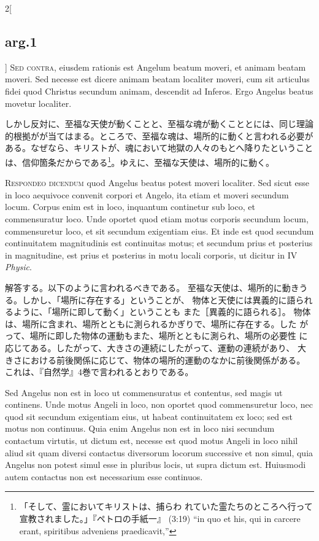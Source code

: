 \documentclass[paper=a4paper,fontsize=10pt,jafontsize=9pt,titlepage]{jlreq}
\begin{document}
\begin{paracol}{2}[\subsection{arg.1}]
{\scshape Sed contra}, eiusdem rationis est Angelum
beatum moveri, et animam beatam moveri. Sed necesse est dicere animam
beatam localiter moveri, cum sit articulus fidei quod Christus secundum
animam, descendit ad Inferos. Ergo Angelus beatus movetur localiter.

\switchcolumn

しかし反対に、至福な天使が動くことと、至福な魂が動くこととには、同じ理論
 的根拠がが当てはまる。ところで、至福な魂は、場所的に動くと言われる必要が
 ある。なぜなら、キリストが、魂において地獄の人々のもとへ降りたということ
 は、信仰箇条だからである\footnote{「そして、霊においてキリストは、捕らわ
 れていた霊たちのところへ行って宣教されました。」『ペトロの手紙一』
 (3:19) ``in quo et his, qui in carcere erant, spiritibus adveniens
 praedicavit,'' }。ゆえに、至福な天使は、場所的に動く。


{\scshape Respondeo dicendum} quod Angelus beatus potest
moveri localiter. Sed sicut esse in loco aequivoce convenit corpori et
Angelo, ita etiam et moveri secundum locum. Corpus enim est in loco,
inquantum continetur sub loco, et commensuratur loco. Unde oportet quod
etiam motus corporis secundum locum, commensuretur loco, et sit secundum
exigentiam eius. Et inde est quod secundum continuitatem magnitudinis
est continuitas motus; et secundum prius et posterius in magnitudine,
est prius et posterius in motu locali corporis, ut dicitur in IV
{\itshape Physic}.

\switchcolumn

解答する。以下のように言われるべきである。
至福な天使は、場所的に動きうる。しかし、「場所に存在する」ということが、
 物体と天使には異義的に語られるように、「場所に即して動く」ということも
 また［異義的に語られる］。
物体は、場所に含まれ、場所とともに測られるかぎりで、場所に存在する。した
 がって、場所に即した物体の運動もまた、場所とともに測られ、場所の必要性
 に応じてある。したがって、大きさの連続にしたがって、運動の連続があり、
 大きさにおける前後関係に応じて、物体の場所的運動のなかに前後関係がある。
 これは、『自然学』4巻で言われるとおりである。

\switchcolumn*

Sed Angelus non est in loco ut commensuratus et contentus, sed
magis ut continens. Unde motus Angeli in loco, non oportet quod
commensuretur loco, nec quod sit secundum exigentiam eius, ut habeat
continuitatem ex loco; sed est motus non continuus. Quia enim Angelus
non est in loco nisi secundum contactum virtutis, ut dictum est, necesse
est quod motus Angeli in loco nihil aliud sit quam diversi contactus
diversorum locorum successive et non simul, quia Angelus non potest
simul esse in pluribus locis, ut supra dictum est. Huiusmodi autem
contactus non est necessarium esse continuos.


\end{paracol}
\end{document}
